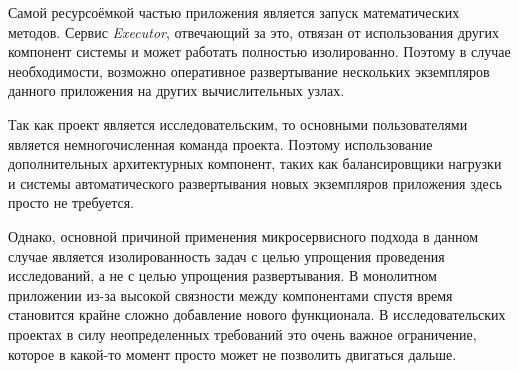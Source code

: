 Самой ресурсоёмкой частью приложения является запуск математических методов.
Сервис \textit{Executor}, отвечающий за это, отвязан от использования других компонент системы
и может работать полностью изолированно.
Поэтому в случае необходимости, возможно оперативное развертывание нескольких экземпляров данного приложения
на других вычислительных узлах.

Так как проект является исследовательским, то основными пользователями является немногочисленная команда проекта.
Поэтому использование дополнительных архитектурных компонент,
таких как балансировщики нагрузки и системы автоматического развертывания новых экземпляров приложения
здесь просто не требуется.

Однако, основной причиной применения микросервисного подхода в данном случае является изолированность задач с целью
упрощения проведения исследований, а не с целью упрощения развертывания.
В монолитном приложении из-за высокой связности между компонентами спустя время становится крайне сложно добавление
нового функционала. В исследовательских проектах в силу неопределенных требований это очень важное ограничение,
которое в какой-то момент просто может не позволить двигаться дальше.
